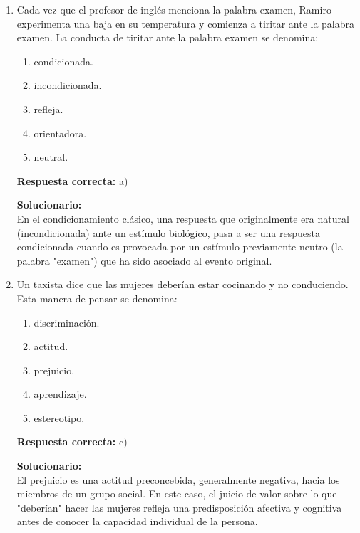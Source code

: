 \begin{enumerate}
	
	\item Cada vez que el profesor de inglés menciona la palabra examen, Ramiro experimenta una baja en su temperatura y comienza a tiritar ante la palabra examen. La conducta de tiritar ante la palabra examen se denomina:
	\begin{enumerate}[label=\alph*)]
		\item condicionada.
		\item incondicionada.
		\item refleja.
		\item orientadora.
		\item neutral.
	\end{enumerate}
	\textbf{Respuesta correcta:} a)
	
	\vspace{2mm}
	\textbf{Solucionario:}\\
	En el condicionamiento clásico, una respuesta que originalmente era natural (incondicionada) ante un estímulo biológico, pasa a ser una respuesta condicionada cuando es provocada por un estímulo previamente neutro (la palabra "examen") que ha sido asociado al evento original.
	
	\vspace{6mm}
	
	\item Un taxista dice que las mujeres deberían estar cocinando y no conduciendo. Esta manera de pensar se denomina:
	\begin{enumerate}[label=\alph*)]
		\item discriminación.
		\item actitud.
		\item prejuicio.
		\item aprendizaje.
		\item estereotipo.
	\end{enumerate}
	\textbf{Respuesta correcta:} c)
	
	\vspace{2mm}
	\textbf{Solucionario:}\\
	El prejuicio es una actitud preconcebida, generalmente negativa, hacia los miembros de un grupo social. En este caso, el juicio de valor sobre lo que "deberían" hacer las mujeres refleja una predisposición afectiva y cognitiva antes de conocer la capacidad individual de la persona.
	
	\vspace{6mm}
	

\end{enumerate}
